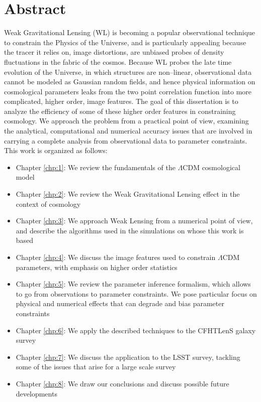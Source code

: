 \chapter*{Abstract} 

Weak Gravitational Lensing (WL) is becoming a popular observational technique to constrain the Physics of the Universe, and is particularly appealing because the tracer it relies on, image distortions, are unbiased probes of density fluctuations in the fabric of the cosmos. Because WL probes the late time evolution of the Universe, in which structures are non--linear, observational data cannot be modeled as Gaussian random fields, and hence physical information on cosmological parameters leaks from the two point correlation function into more complicated, higher order, image features. The goal of this dissertation is to analyze the efficiency of some of these higher order features in constraining cosmology. We approach the problem from a practical point of view, examining the analytical, computational and numerical accuracy issues that are involved in carrying a complete analysis from observational data to parameter constraints. This work is organized as follows:

\begin{itemize}
	\item Chapter \ref{chp:1}: We review the fundamentals of the $\Lambda$CDM cosmological model
	\item Chapter \ref{chp:2}: We review the Weak Gravitational Lensing effect in the context of cosmology
	\item Chapter \ref{chp:3}: We approach Weak Lensing from a numerical point of view, and describe the algorithms used in the simulations on whose this work is based
	\item Chapter \ref{chp:4}: We discuss the image features used to constrain $\Lambda$CDM parameters, with emphasis on higher order statistics
	\item Chapter \ref{chp:5}: We review the parameter inference formalism, which allows to go from observations to parameter constraints. We pose particular focus on physical and numerical effects that can degrade and bias parameter constraints
	\item Chapter \ref{chp:6}: We apply the described techniques to the CFHTLenS galaxy survey
	\item Chapter \ref{chp:7}: We discuss the application to the LSST survey, tackling some of the issues that arise for a large scale survey
	\item Chapter \ref{chp:8}: We draw our conclusions and discuss possible future developments
\end{itemize}